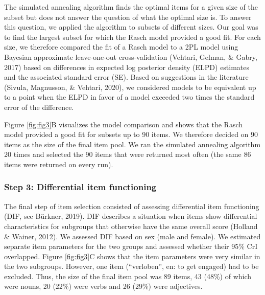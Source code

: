 \documentclass[
  man,floatsintext]{apa6}
\begin{document}
The simulated annealing algorithm finds the optimal items for a given size of the subset but does not answer the question of what the optimal size is. To answer this question, we applied the algorithm to subsets of different sizes. Our goal was to find the largest subset for which the Rasch model provided a good fit. For each size, we therefore compared the fit of a Rasch model to a 2PL model using Bayesian approximate leave-one-out cross-validation (Vehtari, Gelman, \& Gabry, 2017) based on differences in expected log posterior density (ELPD) estimates and the associated standard error (SE). Based on suggestions in the literature (Sivula, Magnusson, \& Vehtari, 2020), we considered models to be equivalent up to a point when the ELPD in favor of a model exceeded two times the standard error of the difference.

Figure \ref{fig:fig3}B visualizes the model comparison and shows that the Rasch model provided a good fit for subsets up to 90 items. We therefore decided on 90 items as the size of the final item pool. We ran the simulated annealing algorithm 20 times and selected the 90 items that were returned most often (the same 86 items were returned on every run).

\hypertarget{step-3-differential-item-functioning}{%
\subsubsection{Step 3: Differential item functioning}\label{step-3-differential-item-functioning}}

The final step of item selection consisted of assessing differential item functioning (DIF, see Bürkner, 2019). DIF describes a situation when items show differential characteristics for subgroups that otherwise have the same overall score (Holland \& Wainer, 2012). We assessed DIF based on sex (male and female). We estimated separate item parameters for the two groups and assessed whether their 95\% CrI overlapped. Figure \ref{fig:fig3}C shows that the item parameters were very similar in the two subgroups. However, one item (``verloben'', en: to get engaged) had to be excluded. Thus, the size of the final item pool was 89 items, 43 (48\%) of which were nouns, 20 (22\%) were verbs and 26 (29\%) were adjectives.
\end{document}

